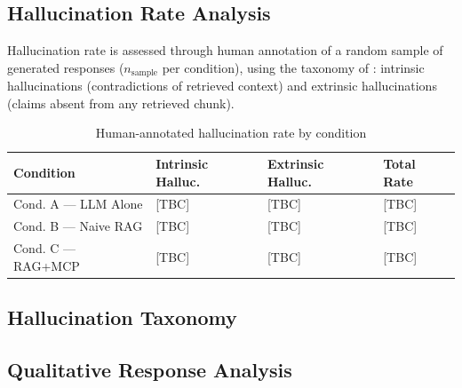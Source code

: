 \subsection{Hallucination Rate Analysis}

Hallucination rate is assessed through human annotation of a random sample of generated responses ($n_{\text{sample}}$ per condition), using the taxonomy of \citet{Ji2023}: intrinsic hallucinations (contradictions of retrieved context) and extrinsic hallucinations (claims absent from any retrieved chunk).

\begin{table}[H]
\centering
\caption{Human-annotated hallucination rate by condition}
\label{tab:hallucination-rate}
\begin{tabularx}{\textwidth}{@{}lXXX@{}}
\toprule
\textbf{Condition} & \textbf{Intrinsic Halluc.} & \textbf{Extrinsic Halluc.} & \textbf{Total Rate} \\
\midrule
Cond. A --- LLM Alone & [TBC] & [TBC] & [TBC] \\
Cond. B --- Naive RAG & [TBC] & [TBC] & [TBC] \\
Cond. C --- RAG+MCP & [TBC] & [TBC] & [TBC] \\
\bottomrule
\end{tabularx}
\end{table}


\subsection{Hallucination Taxonomy}


\subsection{Qualitative Response Analysis}

